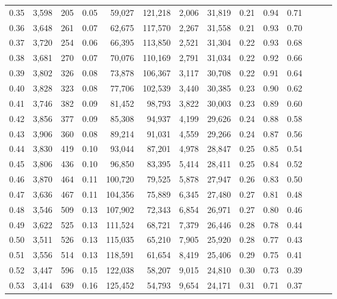 \begin{tabular}{rrrrrrrrrrrrrr}
0.35 &  3,598 &  205 &  0.05 &   59,027 &  121,218 &   2,006 &  31,819 &  0.21 &  0.94 &      0.71 \\
0.36 &  3,648 &  261 &  0.07 &   62,675 &  117,570 &   2,267 &  31,558 &  0.21 &  0.93 &      0.70 \\
0.37 &  3,720 &  254 &  0.06 &   66,395 &  113,850 &   2,521 &  31,304 &  0.22 &  0.93 &      0.68 \\
0.38 &  3,681 &  270 &  0.07 &   70,076 &  110,169 &   2,791 &  31,034 &  0.22 &  0.92 &      0.66 \\
0.39 &  3,802 &  326 &  0.08 &   73,878 &  106,367 &   3,117 &  30,708 &  0.22 &  0.91 &      0.64 \\
0.40 &  3,828 &  323 &  0.08 &   77,706 &  102,539 &   3,440 &  30,385 &  0.23 &  0.90 &      0.62 \\
0.41 &  3,746 &  382 &  0.09 &   81,452 &   98,793 &   3,822 &  30,003 &  0.23 &  0.89 &      0.60 \\
0.42 &  3,856 &  377 &  0.09 &   85,308 &   94,937 &   4,199 &  29,626 &  0.24 &  0.88 &      0.58 \\
0.43 &  3,906 &  360 &  0.08 &   89,214 &   91,031 &   4,559 &  29,266 &  0.24 &  0.87 &      0.56 \\
0.44 &  3,830 &  419 &  0.10 &   93,044 &   87,201 &   4,978 &  28,847 &  0.25 &  0.85 &      0.54 \\
0.45 &  3,806 &  436 &  0.10 &   96,850 &   83,395 &   5,414 &  28,411 &  0.25 &  0.84 &      0.52 \\
0.46 &  3,870 &  464 &  0.11 &  100,720 &   79,525 &   5,878 &  27,947 &  0.26 &  0.83 &      0.50 \\
0.47 &  3,636 &  467 &  0.11 &  104,356 &   75,889 &   6,345 &  27,480 &  0.27 &  0.81 &      0.48 \\
0.48 &  3,546 &  509 &  0.13 &  107,902 &   72,343 &   6,854 &  26,971 &  0.27 &  0.80 &      0.46 \\
0.49 &  3,622 &  525 &  0.13 &  111,524 &   68,721 &   7,379 &  26,446 &  0.28 &  0.78 &      0.44 \\
0.50 &  3,511 &  526 &  0.13 &  115,035 &   65,210 &   7,905 &  25,920 &  0.28 &  0.77 &      0.43 \\
0.51 &  3,556 &  514 &  0.13 &  118,591 &   61,654 &   8,419 &  25,406 &  0.29 &  0.75 &      0.41 \\
0.52 &  3,447 &  596 &  0.15 &  122,038 &   58,207 &   9,015 &  24,810 &  0.30 &  0.73 &      0.39 \\
0.53 &  3,414 &  639 &  0.16 &  125,452 &   54,793 &   9,654 &  24,171 &  0.31 &  0.71 &      0.37 \\

\end{tabular}
